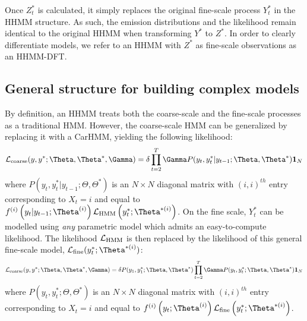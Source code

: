 Once $Z^*_t$ is calculated, it simply replaces the original fine-scale process $Y^*_t$ in the HHMM structure. As such, the emission distributions and the likelihood remain identical to the original HHMM when transforming $Y^*$ to $Z^*$. In order to clearly differentiate models, we refer to an HHMM with $Z^*$ as fine-scale observations as an HHMM-DFT.



\subsection{General structure for building complex models}

By definition, an HHMM treats both the coarse-scale and the fine-scale processes as a traditional HMM. However, the coarse-scale HMM can be generalized by replacing it with a CarHMM, yielding the following likelihood:
\[
\calL_{\text{coarse}}(y,y^*;\Theta,\Theta^*,\Gamma) = \delta \prod_{t=2}^T \Gamma P(y_t,y^*_t|y_{t-1};\Theta,\Theta^*) \mathbf{1}_N
\]
where $P(y_t,y^*_t|y_{t-1};\Theta,\Theta^*) $ is an $N \times N$ diagonal matrix with $(i,i)^{th}$ entry corresponding to $X_t=i$ and equal to $f^{(i)}\left(y_t|y_{t-1};\Theta^{(i)}\right)\calL_{\text{HMM}}\left(y^*_t;\Theta^{*(i)}\right)$. 
On the fine scale, $Y^*_t$ can be modelled using \textit{any} parametric model which admits an easy-to-compute likelihood. The likelihood $\mathcal{L}_{\text{HMM}}$ is then replaced by the likelihood of this general fine-scale model, $\calL_{\text{fine}}(y^*_t;\Theta^{*(i)})$:
\[
\calL_{\text{coarse}}(y,y^*;\Theta,\Theta^*,\Gamma) = \delta P(y_1,y^*_1;\Theta,\Theta^*) \prod_{t=2}^T \Gamma P(y_t,y^*_t;\Theta,\Theta^*) \mathbf{1}_N
\]
where $P(y_t,y^*_t;\Theta,\Theta^*) $ is an $N \times N$ diagonal matrix with $(i,i)^{th}$ entry corresponding to $X_t=i$ and equal to $f^{(i)}\left(y_t;\Theta^{(i)}\right)\calL_{\text{fine}}\left(y^*_t;\Theta^{*(i)}\right)$. 

